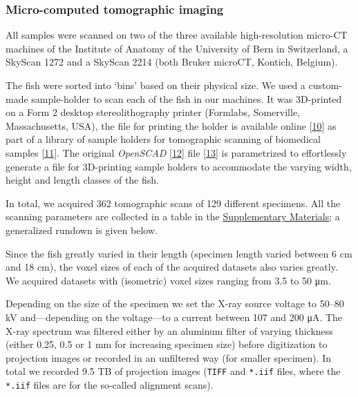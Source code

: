 \hypertarget{micro-computed-tomographic-imaging}{%
\subsubsection{Micro-computed tomographic imaging}\label{micro-computed-tomographic-imaging}}

All samples were scanned on two of the three available high-resolution micro-CT machines of the Institute of Anatomy of the University of Bern in Switzerland, a SkyScan 1272 and a SkyScan 2214 (both Bruker microCT, Kontich, Belgium).

The fish were sorted into `bins' based on their physical size.
We used a custom-made sample-holder to scan each of the fish in our machines.
It was 3D-printed on a Form 2 desktop stereolithography printer (Formlabs, Somerville, Massachusetts, USA), the file for printing the holder is available online {[}\protect\hyperlink{ref-VCZPOv2f}{10}{]} as part of a library of sample holders for tomographic scanning of biomedical samples {[}\protect\hyperlink{ref-115PPSuQp}{11}{]}.
The original \emph{OpenSCAD} {[}\protect\hyperlink{ref-wsjdcTeC}{12}{]} file {[}\protect\hyperlink{ref-f7OzrzUv}{13}{]} is parametrized to effortlessly generate a file for 3D-printing sample holders to accommodate the varying width, height and length classes of the fish.

In total, we acquired 362 tomographic scans of 129 different specimens.
All the scanning parameters are collected in a table in the \protect\hyperlink{supplementary-materials}{Supplementary Materials}; a generalized rundown is given below.

Since the fish greatly varied in their length (specimen length varied between 6 cm and 18 cm), the voxel sizes of each of the acquired datasets also varies greatly.
We acquired datasets with (isometric) voxel sizes ranging from 3.5 to 50 μm.

Depending on the size of the specimen we set the X-ray source voltage to 50--80 kV and---depending on the voltage---to a current between 107 and 200 μA.
The X-ray spectrum was filtered either by an aluminum filter of varying thickness (either 0.25, 0.5 or 1 mm for increasing specimen size) before digitization to projection images or recorded in an unfiltered way (for smaller specimen).
In total we recorded 9.5 TB of projection images (\texttt{TIFF} and \texttt{*.iif} files, where the \texttt{*.iif} files are for the so-called alignment scans).

